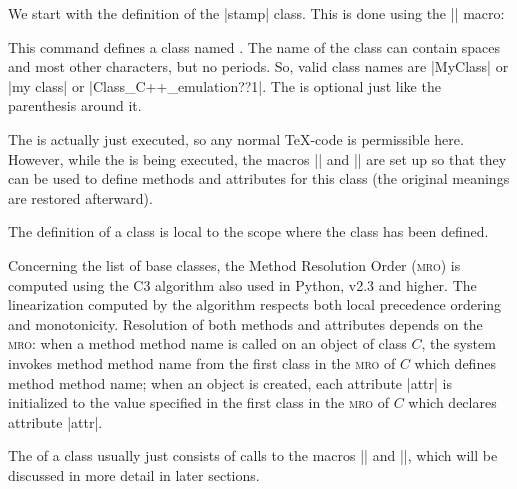 We start with the definition of the |stamp| class. This is done using
the |\pgfooclass| macro:

\begin{command}{\pgfooclass{}}
  This command defines a class named . The name of
  the class can contain spaces and most other characters, but no
  periods. So, valid class names are |MyClass| or |my class| or
  |Class_C++_emulation??1|. The  is
  optional just like the parenthesis around it.

  The  is actually just executed, so any
  normal \TeX-code is permissible here. However, while the  is
  being executed, the macros |\method| and |\attribute| are set up so
  that they can be used to define methods and attributes for this
  class (the original meanings are restored afterward).

  The definition of a class is local to the scope where the class has
  been defined.
\begin{codeexample}

\end{codeexample}

  Concerning the list of base classes, the Method Resolution Order
  (\textsc{mro}) is computed using the C3 algorithm also used in Python, v2.3
  and higher. The linearization computed by the algorithm respects
  both  local precedence ordering and monotonicity. Resolution of both
  methods and attributes depends on the \textsc{mro}: when a method method name
  is called on an object of class $C$, the system invokes method
  method name from the first class in the \textsc{mro} of $C$ which defines
  method method name; when an object is created, each attribute |attr|
  is initialized to the value specified in the first class in the \textsc{mro}
  of $C$ which declares attribute |attr|. 
\end{command}

The  of a class usually just consists of calls to the macros
|\attribute| and |\method|, which will be discussed in more detail in
later sections.



